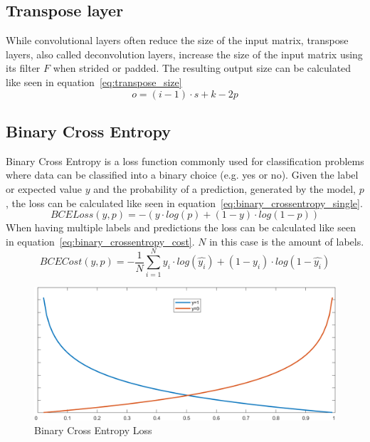 \documentclass{article}
\begin{document}
\subsection{Transpose layer}
\label{ref:transpose_2d}
While convolutional layers often reduce the size of the input matrix, transpose layers, also called deconvolution layers, increase the size of the input matrix using its filter $F$ when strided or padded. The resulting output size can be calculated like seen in equation~\ref{eq:transpose_size}
\begin{equation}
    \label{eq:transpose_size}
    o = (i-1)\cdot s + k - 2p
\end{equation}


\subsection{Binary Cross Entropy}
\label{ref:binary_crossentropy}
Binary Cross Entropy is a loss function commonly used for classification problems where data can be classified into a binary choice (e.g. yes or no). Given the label or expected value $y$ and the probability of a prediction, generated by the model, $p$, the loss can be calculated like seen in equation~\ref{eq:binary_crossentropy_single}. 
\begin{equation}
    \label{eq:binary_crossentropy_single}
    BCELoss(y, p) = -\left(y \cdot log(p)+(1-y)\cdot log(1-p)\right)
\end{equation}
When having multiple labels and predictions the loss can be calculated like seen in equation~\ref{eq:binary_crossentropy_cost}. $N$ in this case is the amount of labels.
\begin{equation}
    \label{eq:binary_crossentropy_cost}
    BCECost(y, p) = -\frac{1}{N}\sum^N_{i=1} y_i \cdot log(\hat{y_i})+(1-y_i)\cdot log(1-\hat{y_i})
\end{equation}
\begin{figure}[!ht]
    \includegraphics[scale=0.68]{images/logloss.png}
    \centering
    \caption{Binary Cross Entropy Loss}
    \label{fig:binary_crossentropy}
\end{figure}
\end{document}
